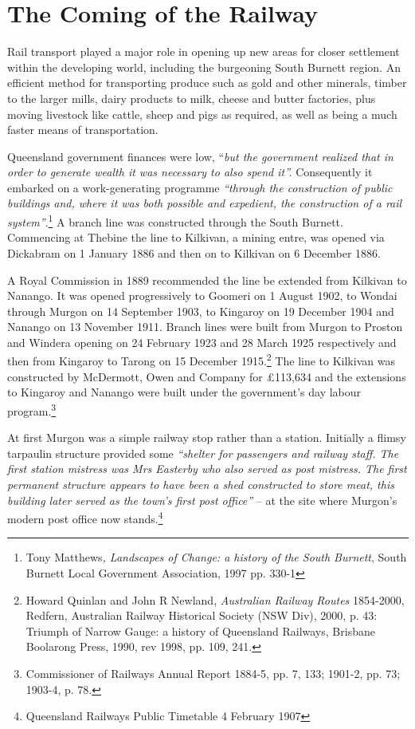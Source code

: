 \hypertarget{the-coming-of-the-railway}{%
\section{The Coming of the Railway}\label{the-coming-of-the-railway}}

Rail transport played a major role in opening up new areas for closer settlement within the developing world, including the burgeoning South Burnett region. An efficient method for transporting produce such as gold and other minerals, timber to the larger mills, dairy products to milk, cheese and butter factories, plus moving livestock like cattle, sheep and pigs as required, as well as being a much faster means of transportation.

Queensland government finances were low, ``\emph{but the government realized that in order to generate wealth it was necessary to also spend it''.} Consequently it embarked on a work-generating programme \emph{``through the construction of public buildings and, where it was both possible and expedient, the construction of a rail system''}.\footnote{Tony Matthews\emph{, Landscapes of Change: a history of the South Burnett}, South Burnett Local Government Association, 1997 pp. 330-1} A branch line was constructed through the South Burnett. Commencing at Thebine the line to Kilkivan, a mining entre, was opened via Dickabram on 1 January 1886 and then on to Kilkivan on 6 December 1886.

A Royal Commission in 1889 recommended the line be extended from Kilkivan to Nanango. It was opened progressively to Goomeri on 1 August 1902, to Wondai through Murgon on 14 September 1903, to Kingaroy on 19 December 1904 and Nanango on 13 November 1911. Branch lines were built from Murgon to Proston and Windera opening on 24 February 1923 and 28 March 1925 respectively and then from Kingaroy to Tarong on 15 December 1915.\footnote{Howard Quinlan and John R Newland, \emph{Australian Railway Routes} 1854-2000, Redfern, Australian Railway Historical Society (NSW Div), 2000, p. 43: Triumph of Narrow Gauge: a history of Queensland Railways, Brisbane Boolarong Press, 1990, rev 1998, pp. 109, 241.} The line to Kilkivan was constructed by McDermott, Owen and Company for £113,634 and the extensions to Kingaroy and Nanango were built under the government's day labour program.\footnote{Commissioner of Railways Annual Report 1884-5, pp. 7, 133; 1901-2, pp. 73; 1903-4, p. 78.}

At first Murgon was a simple railway stop rather than a station. Initially a flimsy tarpaulin structure provided some \emph{``shelter for passengers and railway staff. The first station mistress was Mrs Easterby who also served as post mistress. The first permanent structure appears to have been a shed constructed to store meat, this building later served as the town's first post office''} -- at the site where Murgon's modern post office now stands.\footnote{Queensland Railways Public Timetable 4 February 1907}

